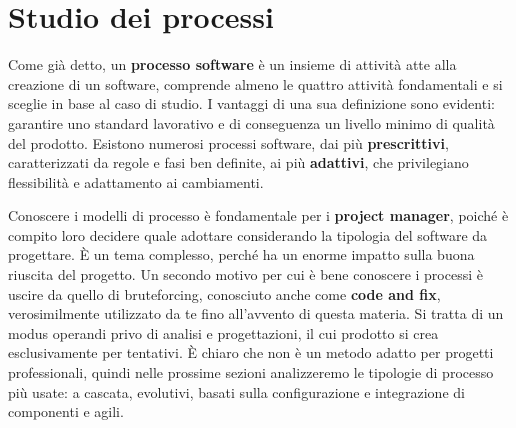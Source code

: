 \section{Studio dei processi}
Come già detto, un \textbf{processo software} è un insieme di attività atte alla creazione di un software, comprende almeno le quattro attività fondamentali e si sceglie in base al caso di studio. I vantaggi di una sua definizione sono evidenti: garantire uno standard lavorativo e di conseguenza un livello minimo di qualità del prodotto. Esistono numerosi processi software, dai più \textbf{prescrittivi}, caratterizzati da regole e fasi ben definite, ai più \textbf{adattivi}, che privilegiano flessibilità e adattamento ai cambiamenti.\par
Conoscere i modelli di processo è fondamentale per i \textbf{project manager}, poiché è compito loro decidere quale adottare considerando la tipologia del software da progettare. È un tema complesso, perché ha un enorme impatto sulla buona riuscita del progetto. Un secondo motivo per cui è bene conoscere i processi è uscire da quello di bruteforcing, conosciuto anche come \textbf{code and fix}, verosimilmente utilizzato da te fino all'avvento di questa materia. Si tratta di un modus operandi privo di analisi e progettazioni, il cui prodotto si crea esclusivamente per tentativi. È chiaro che non è un metodo adatto per progetti professionali, quindi nelle prossime sezioni analizzeremo le tipologie di processo più usate: a cascata, evolutivi, basati sulla configurazione e integrazione di componenti e agili.

%

